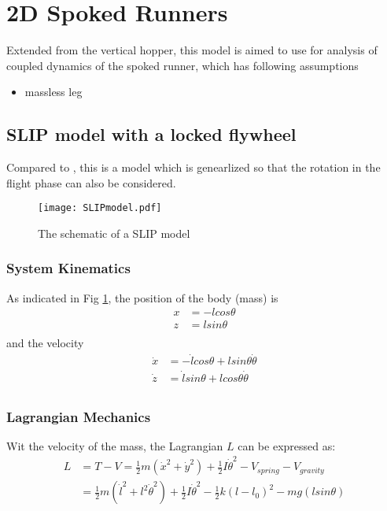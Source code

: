 \section{2D Spoked Runners}

Extended from the vertical hopper, this model is aimed to use for analysis of coupled dynamics of the spoked runner, which has following assumptions

\begin{itemize}
\item massless leg 
\end{itemize}


\subsection{SLIP model with a locked flywheel}
Compared to \cite{Shen2016}, this is a model which is genearlized so that the rotation in the flight phase can also be considered.
\begin{figure}[h]
\centering

\texttt{[image: SLIPmodel.pdf]}
\caption{The schematic of a SLIP model }
\label{fig.SLIPmodel}
\end{figure}

\subsubsection{System Kinematics}
As indicated in Fig \ref{fig.SLIPmodel}, the position of the body (mass) is
\begin{align*}
x &= -lcos\theta\\
z &= lsin\theta\\
\end{align*}
and the velocity
\begin{align*}
\dot x &= -\dot lcos\theta +lsin\theta\dot \theta\\
\dot z &= \dot lsin\theta + lcos\theta \dot{\theta}\\
\end{align*}





\subsubsection{Lagrangian Mechanics}
Wit the velocity of the mass, the Lagrangian $L$ can be expressed as:
\begin{align*}
L &= T-V = \frac{1}{2}m(\dot x^2+\dot y^2) + \frac{1}{2}I\dot\theta^2 - V_{spring} - V_{gravity}\\
 &= \frac{1}{2}m(\dot l^2 + l^2\dot \theta^2 )+ \frac{1}{2}I\dot\theta^2 - \frac{1}{2}k(l-l_0)^2-mg(lsin\theta)
\end{align*}


